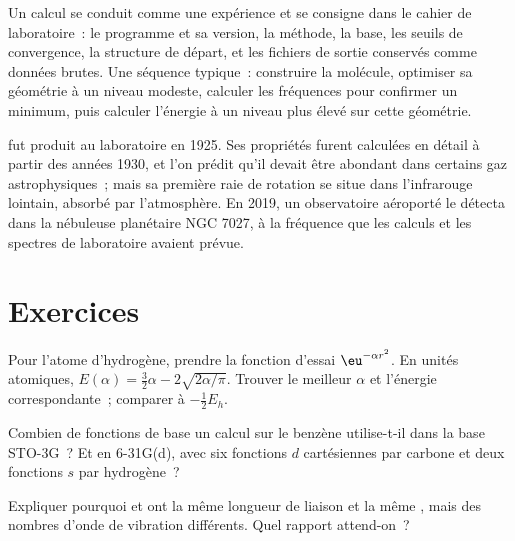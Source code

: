 \begin{inthelab}
Un calcul se conduit comme une expérience et se consigne dans le cahier
de laboratoire~: le programme et sa version, la méthode, la base, les
seuils de convergence, la structure de départ, et les fichiers de sortie
conservés comme données brutes. Une séquence typique~: construire la
molécule, optimiser sa géométrie à un niveau modeste, calculer les
fréquences pour confirmer un minimum, puis calculer l'énergie à un niveau
plus élevé sur cette géométrie.
\end{inthelab}

\begin{history}
 fut produit au laboratoire en 1925. Ses propriétés furent
calculées en détail à partir des années 1930, et l'on prédit qu'il
devait être abondant dans certains gaz astrophysiques~; mais sa première
raie de rotation se situe dans l'infrarouge lointain, absorbé par
l'atmosphère. En 2019, un observatoire aéroporté le détecta dans la
nébuleuse planétaire NGC 7027, à la fréquence que les calculs et les
spectres de laboratoire avaient prévue.
\end{history}

\section{Exercices}

\begin{exercise}[$\star$]\label{exo:b3:computational-chemistry:1}
Pour l'atome d'hydrogène, prendre la fonction d'essai $\eu^{-\alpha r^2}$.
En unités atomiques, $E(\alpha) = \frac32\alpha - 2\sqrt{2\alpha/\pi}$.
Trouver le meilleur $\alpha$ et l'énergie correspondante~; comparer à
$-\frac12E_h$.
\end{exercise}

\begin{exercise}[$\star$]\label{exo:b3:computational-chemistry:2}
Combien de fonctions de base un calcul sur le benzène utilise-t-il dans
la base STO-3G~? Et en 6-31G(d), avec six fonctions $d$ cartésiennes par
carbone et deux fonctions $s$ par hydrogène~?
\end{exercise}

\begin{exercise}[$\star$]\label{exo:b3:computational-chemistry:3}
Expliquer pourquoi  et  ont la même longueur de liaison et
la même , mais des nombres d'onde de vibration
différents. Quel rapport attend-on~?
\end{exercise}

